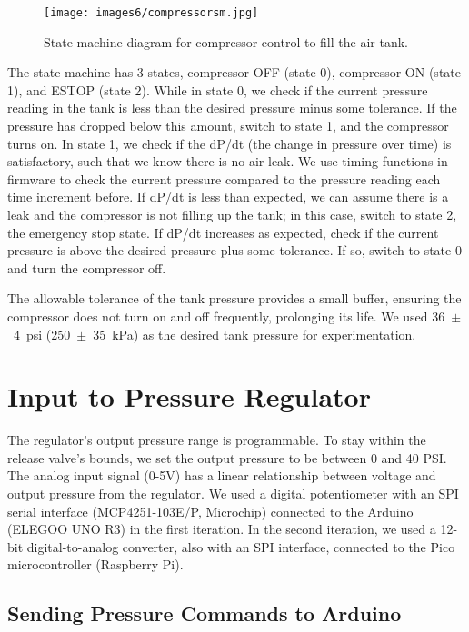 \begin{figure}[ht]
    \centering
    \texttt{[image: images6/compressorsm.jpg]}
    \caption{State machine diagram for compressor control to fill the air tank.}
    \label{fig:compressorsm}
\end{figure}

The state machine has 3 states, compressor OFF (state 0), compressor ON (state 1), and ESTOP (state 2). While in state 0, we check if the current pressure reading in the tank is less than the desired pressure minus some tolerance. If the pressure has dropped below this amount, switch to state 1, and the compressor turns on. In state 1, we check if the dP/dt (the change in pressure over time) is satisfactory, such that we know there is no air leak. We use timing functions in firmware to check the current pressure compared to the pressure reading each time increment before. If dP/dt is less than expected, we can assume there is a leak and the compressor is not filling up the tank; in this case, switch to state 2, the emergency stop state. If dP/dt increases as expected, check if the current pressure is above the desired pressure plus some tolerance. If so, switch to state 0 and turn the compressor off. 

The allowable tolerance of the tank pressure provides a small buffer, ensuring the compressor does not turn on and off frequently, prolonging its life. We used 36~$\pm$~4~psi (250~$\pm$~35~kPa) as the desired tank pressure for experimentation. 

\section{Input to Pressure Regulator}

The regulator's output pressure range is programmable. To stay within the release valve's bounds, we set the output pressure to be between 0 and 40 PSI. 
The analog input signal (0-5V) has a linear relationship between voltage and output pressure from the regulator. We used a digital potentiometer with an SPI serial interface (MCP4251-103E/P, Microchip) connected to the Arduino (ELEGOO UNO R3) in the first iteration. In the second iteration, we used a 12-bit digital-to-analog converter, also with an SPI interface, connected to the Pico microcontroller (Raspberry Pi). 

\subsection{Sending Pressure Commands to Arduino}

